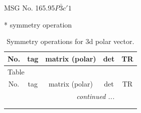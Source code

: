 \documentclass[fleqn,8pt]{jsarticle}
\begin{document}
\setcounter{MaxMatrixCols}{32}

\renewcommand{\tablename}{Table~}
\renewcommand{\figurename}{Figure~}
\begin{center}
\LARGE
MSG No. 165.95\quad$P\bar{3}c'1$
\end{center}
* symmetry operation
\renewcommand{\arraystretch}{1.3}
\begin{longtable}{ccccc}
\caption{Symmetry operations for 3d polar vector.}
 \\
 \hline \hline
No. & tag & matrix (polar) & det & TR \\ \hline \endfirsthead

\multicolumn{4}{l}{\tablename\ \thetable{}} \\
 \hline \hline
No. & tag & matrix (polar) & det & TR \\ \hline \endhead

 \hline \hline
\multicolumn{4}{r}{\footnotesize\it continued ...} \\ \endfoot

 \hline \hline
\multicolumn{4}{r}{} \\ \endlastfoot


\end{longtable}
\end{document}
